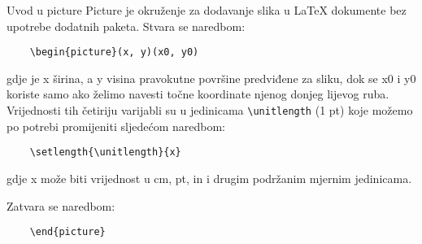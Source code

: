 \begin{frame}{Uvod u picture}
Picture je okruženje za dodavanje slika u LaTeX dokumente bez upotrebe dodatnih paketa.\newline
Stvara se naredbom:

\begin{verbatim}
	\begin{picture}(x, y)(x0, y0)
\end{verbatim}

gdje je x širina, a y visina pravokutne površine predviđene za sliku, dok se x0 i y0 koriste samo ako želimo navesti točne koordinate njenog donjeg lijevog ruba.\newpage
Vrijednosti tih četiriju varijabli su u jedinicama \verb|\unitlength| (1 pt) koje možemo po potrebi promijeniti sljedećom naredbom:

\begin{verbatim}
	\setlength{\unitlength}{x}
\end{verbatim}

gdje x može biti vrijednost u cm, pt, in i drugim podržanim mjernim jedinicama.\newline

Zatvara se naredbom:

\begin{verbatim}
	\end{picture}
\end{verbatim}

\end{frame}
